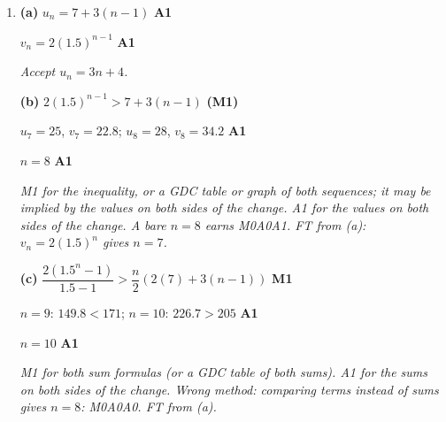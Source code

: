 \documentclass[12pt, twoside]{article}
\begin{document}
\begin{enumerate}[itemsep=0.3cm]
\newpage

\item[4.] [Maximum mark: 8]

\textbf{(a)} $u_{n} = 7 + 3(n - 1)$ \hfill \textbf{A1}

$v_{n} = 2(1.5)^{n - 1}$ \hfill \textbf{A1}

\emph{Accept $u_{n} = 3n + 4$.}

\textbf{(b)} $2(1.5)^{n - 1} > 7 + 3(n - 1)$ \hfill \textbf{(M1)}

$u_{7} = 25$, $v_{7} = 22.8$; \quad $u_{8} = 28$, $v_{8} = 34.2$ \hfill \textbf{A1}

$n = 8$ \hfill \textbf{A1}

\emph{M1 for the inequality, or a GDC table or graph of both sequences; it
may be implied by the values on both sides of the change. A1
for the values on both sides of the change. A bare $n = 8$ earns M0A0A1. FT from (a): $v_{n} = 2(1.5)^{n}$
gives $n = 7$.}

\textbf{(c)} $\dfrac{2\left(1.5^{n} - 1\right)}{1.5 - 1} > \dfrac{n}{2}\left(2(7) + 3(n - 1)\right)$ \hfill \textbf{M1}

$n = 9$: $149.8 < 171$; \quad $n = 10$: $226.7 > 205$ \hfill \textbf{A1}

$n = 10$ \hfill \textbf{A1}

\emph{M1 for both sum formulas (or a GDC table of both sums). A1 for the
sums on both sides of the change. Wrong method: comparing terms instead of
sums gives $n = 8$: M0A0A0. FT from (a).}

\end{enumerate}
\end{document}
